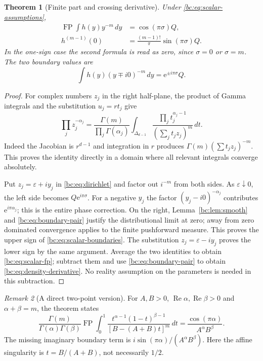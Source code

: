 \documentclass[11pt,letterpaper]{article}
\numberwithin{equation}{section}
\newtheorem{theorem}{Theorem}[section]
\theoremstyle{definition}
\theoremstyle{remark}
\newtheorem{remark}[theorem]{Remark}
\newcommand{\bcFP}{\operatorname{FP}}
\newcommand{\bcRe}{\operatorname{Re}}
\newcommand{\bce}{\mathrm e}
\begin{document}
\begin{theorem}[Finite part and crossing derivative]\label{bc:thm:scalar}
Under \eqref{bc:eq:scalar-assumptions},
\begin{align}
 \bcFP\int h(y)y^{-m}\,dy&=\cos(\pi\sigma)Q,
       \label{bc:eq:scalar-fp}\\
 h^{(m-1)}(0)&=\frac{(m-1)!}{\pi}\sin(\pi\sigma)Q.
       \label{bc:eq:density-derivative}
\end{align}
In the one-sign case the second formula is read as zero, since
$\sigma=0$ or $\sigma=m$. The two boundary values are
\begin{equation}\label{bc:eq:scalar-boundaries}
 \int h(y)(y\mp i0)^{-m}\,dy=\bce^{\pm i\pi\sigma}Q.
\end{equation}
\end{theorem}
\begin{proof}
For complex numbers $z_j$ in the right half-plane, the product of Gamma
integrals and the substitution $u_j=rt_j$ give
\begin{equation}\label{bc:eq:dirichlet}
 \prod_j z_j^{-\alpha_j}
 =\frac{\Gamma(m)}{\prod_j\Gamma(\alpha_j)}
 \int_{\Delta_{d-1}}\frac{\prod_jt_j^{\alpha_j-1}}
                              {(\sum_jt_jz_j)^m}\,dt.
\end{equation}
Indeed the Jacobian is $r^{d-1}$ and integration in $r$ produces
$\Gamma(m)(\sum t_jz_j)^{-m}$. This proves the identity directly in a
domain where all relevant integrals converge absolutely.

Put $z_j=\varepsilon+i y_j$ in \eqref{bc:eq:dirichlet} and factor out
$i^{-m}$ from both sides. As $\varepsilon\downarrow0$, the left side
becomes $Q\bce^{i\pi\sigma}$. For a negative $y_j$ the factor
$(y_j-i0)^{-\alpha_j}$ contributes $\bce^{i\pi\alpha_j}$; this is the
entire phase correction. On the right, Lemma~\ref{bc:lem:smooth} and
\eqref{bc:eq:boundary-pair} justify the distributional limit at zero;
away from zero dominated convergence applies to the finite pushforward
measure. This proves the upper sign of
\eqref{bc:eq:scalar-boundaries}. The substitution
$z_j=\varepsilon-i y_j$ proves the lower sign by the same argument.
Average the two identities to obtain \eqref{bc:eq:scalar-fp}; subtract
them and use \eqref{bc:eq:boundary-pair} to obtain
\eqref{bc:eq:density-derivative}. No reality assumption on the parameters
is needed in this subtraction.
\end{proof}

\begin{remark}[A direct two-point version]
For $A,B>0$, $\bcRe\alpha,\bcRe\beta>0$ and $\alpha+\beta=m$, the theorem
states
\begin{equation}\label{bc:eq:two-beta}
 \frac{\Gamma(m)}{\Gamma(\alpha)\Gamma(\beta)}
 \bcFP\int_0^1
 \frac{t^{\alpha-1}(1-t)^{\beta-1}}
      {[B-(A+B)t]^m}\,dt
 =\frac{\cos(\pi\alpha)}{A^\alpha B^\beta}.
\end{equation}
The missing imaginary boundary term is
$i\sin(\pi\alpha)/(A^\alpha B^\beta)$. Here the affine singularity is
$t=B/(A+B)$, not necessarily $1/2$.
\end{remark}
\end{document}
